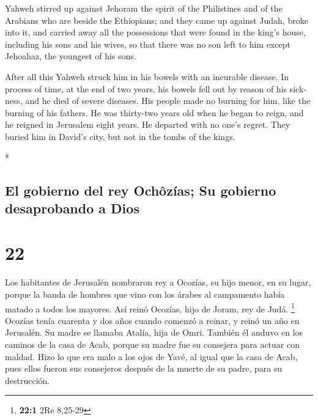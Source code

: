 \begin{paracol}{2}
\begin{otherlanguage}{english}
 Yahweh stirred up against Jehoram the spirit of the
Philistines and of the Arabians who are beside the Ethiopians;
 and they came up against Judah, broke into it, and
carried away all the possessions that were found in the king's house,
including his sons and his wives, so that there was no son left to him
except Jehoahaz, the youngest of his sons.

 After all this Yahweh struck him in his bowels with an
incurable disease.  In process of time, at the end of two
years, his bowels fell out by reason of his sickness, and he died of
severe diseases. His people made no burning for him, like the burning of
his fathers.  He was thirty-two years old when he began
to reign, and he reigned in Jerusalem eight years. He departed with no
one's regret. They buried him in David's city, but not in the tombs of
the kings.

\end{otherlanguage}

\switchcolumn[0]*

\hypertarget{el-gobierno-del-rey-ochuxf4zuxedas-su-gobierno-desaprobando-a-dios}{%
\subsection{El gobierno del rey Ochôzías; Su gobierno desaprobando a
Dios}\label{el-gobierno-del-rey-ochuxf4zuxedas-su-gobierno-desaprobando-a-dios}}

\hypertarget{section-42}{%
\section{22}\label{section-42}}

 Los habitantes de Jerusalén nombraron rey a Ocozías, su
hijo menor, en su lugar, porque la banda de hombres que vino con los
árabes al campamento había matado a todos los mayores. Así reinó
Ocozías, hijo de Joram, rey de Judá. \footnote{\textbf{22:1} 2Re 8,25-29}
 Ocozías tenía cuarenta y dos años cuando comenzó a
reinar, y reinó un año en Jerusalén. Su madre se llamaba Atalía, hija de
Omri.  También él anduvo en los caminos de la casa de
Acab, porque su madre fue su consejera para actuar con maldad.
 Hizo lo que era malo a los ojos de Yavé, al igual que la
casa de Acab, pues ellos fueron sus consejeros después de la muerte de
su padre, para su destrucción.

\hypertarget{su-pacto-con-joram-de-israel-y-su-muerte-por-jehuxfa}{%
}
\end{paracol}
